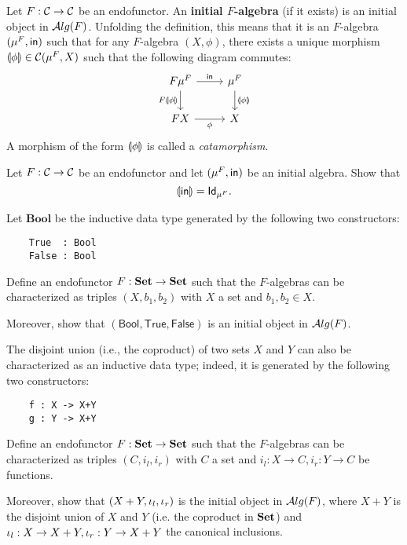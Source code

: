 \begin{dfn}\label{dfn:initial-alg}
  Let $F:\CC\to\CC$ be an endofunctor. An \textbf{initial $F$-algebra} (if it exists) is an initial object in $\ALG{F}$.
  Unfolding the definition, this means that it is an $F$-algebra $(\Initalg{F}, \In)$ such that for any $F$-algebra $(X,\phi)$, there exists a unique morphism $\catam{\phi} \in \CHom{\CC}{\Initalg{F}}{X}$ such that the following diagram commutes:
\begin{equation}\label{eq:initial-f-alg}
\begin{tikzcd}
{F\Initalg{F}} 
\arrow[r, "\In"] 
\arrow[d,swap, "F\catam{\phi}"]
& {\Initalg{F}} 
\arrow[d, "\catam{\phi}"] 
\\
FX
\arrow[r, swap, "\phi"] 
& X
\end{tikzcd}
\end{equation}
A morphism of the form $\catam{\phi}$ is called a \textit{catamorphism}.
\end{dfn}

\begin{exer}\label{exer:in_catamorphism_id}
  Let $F:\CC\to\CC$ be an endofunctor and let $(\Initalg F, \In)$ be an initial algebra. Show that
  \[\catam{\In} = \Id[\Initalg{F}].\]
\end{exer}

\begin{exer}\label{exer:bool_as_initial_algebra}
 Let $\mathbf{Bool}$ be the inductive data type generated by the following two constructors:
 \begin{lstlisting}
    True  : Bool
    False : Bool
  \end{lstlisting}
 Define an endofunctor $F:\SET\to \SET$ such that the $F$-algebras can be characterized as triples $(X, b_1, b_2)$ with $X$ a set and $b_1,b_2\in X$.
 
Moreover, show that $(\mathsf{Bool}, \mathsf{True}, \mathsf{False})$ is an initial object in $\ALG{F}$.
\end{exer}

\begin{exer}\label{exer:coproduct_as_initial_algebra}
The disjoint union (i.e., the coproduct) of two sets $X$ and $Y$ can also be characterized as an inductive data type; indeed, it is generated by the following two constructors:
 \begin{lstlisting}
    f : X -> X+Y
    g : Y -> X+Y
  \end{lstlisting}
Define an endofunctor $F:\SET\to \SET$ such that the $F$-algebras can be characterized as triples $(C, i_l, i_r)$ with $C$ a set and $i_l : X\to C, i_r : Y\to C$ be functions.
 
Moreover, show that $(X + Y, \inl, \inr)$ is the initial object in $\ALG{F}$, where $X+Y$ is the disjoint union of $X$ and $Y$ (i.e. the coproduct in $\SET$) and $\inl:X\to X+Y, \inr:Y\to X+Y$ the canonical inclusions.
\end{exer}

